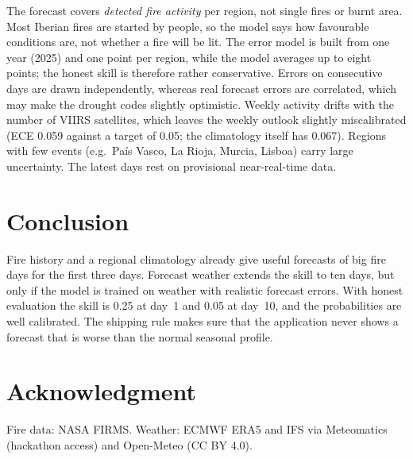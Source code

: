 \documentclass[conference,a4paper]{IEEEtran}
\begin{document}
The forecast covers \emph{detected fire activity} per region, not single fires or burnt area. Most Iberian fires are
started by people, so the model says how favourable conditions are, not whether a fire will be lit. The error model is
built from one year (2025) and one point per region, while the model averages up to eight points; the honest skill is
therefore rather conservative. Errors on consecutive days are drawn independently, whereas real forecast errors are
correlated, which may make the drought codes slightly optimistic. Weekly activity drifts with the number of VIIRS
satellites, which leaves the weekly outlook slightly miscalibrated (ECE 0.059 against a target of 0.05; the climatology
itself has 0.067). Regions with few events (e.g.\ Pa\'{i}s Vasco, La Rioja, Murcia, Lisboa) carry large
uncertainty. The latest days rest on provisional near-real-time data.

\section{Conclusion}

Fire history and a regional climatology already give useful forecasts of big fire days for the first three days.
Forecast weather extends the skill to ten days, but only if the model is trained on weather with realistic forecast
errors. With honest evaluation the skill is 0.25 at day~1 and 0.05 at day~10, and the probabilities are well
calibrated. The shipping rule makes sure that the application never shows a forecast that is worse than the normal
seasonal profile.

\section*{Acknowledgment}
Fire data: NASA FIRMS. Weather: ECMWF ERA5 and IFS via Meteomatics (hackathon access) and Open-Meteo (CC BY 4.0).



\end{document}

